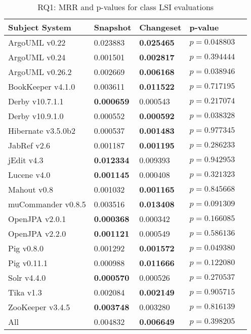 
\begin{table}[t]
\renewcommand{\arraystretch}{1.3}
\footnotesize
\centering
\caption{RQ1: MRR and p-values for class LSI evaluations}
\begin{tabular}{l|ll|ll}
   \toprule
    Subject System & Snapshot & Changeset & p-value  \\
    \midrule

ArgoUML v0.22 & 0.023883 & {\bf 0.025465 } & $p = 0.048803$ \\
ArgoUML v0.24 & 0.001501 & {\bf 0.002817 } & $p = 0.394444$ \\
ArgoUML v0.26.2 & 0.002669 & {\bf 0.006168 } & $p = 0.038946$ \\
BookKeeper v4.1.0 & 0.003611 & {\bf 0.011522 } & $p = 0.717195$ \\
Derby v10.7.1.1 & {\bf 0.000659 } & 0.000543 & $p = 0.217074$ \\
Derby v10.9.1.0 & 0.000552 & {\bf 0.000592 } & $p = 0.038328$ \\
Hibernate v3.5.0b2 & 0.000537 & {\bf 0.001483 } & $p = 0.977345$ \\
JabRef v2.6 & 0.001187 & {\bf 0.001195 } & $p = 0.286233$ \\
jEdit v4.3 & {\bf 0.012334 } & 0.009393 & $p = 0.942953$ \\
Lucene v4.0 & {\bf 0.001145 } & 0.000408 & $p = 0.321323$ \\
Mahout v0.8 & 0.001032 & {\bf 0.001165 } & $p = 0.845668$ \\
muCommander v0.8.5 & 0.003516 & {\bf 0.013408 } & $p = 0.091309$ \\
OpenJPA v2.0.1 & {\bf 0.000368 } & 0.000342 & $p = 0.166085$ \\
OpenJPA v2.2.0 & {\bf 0.001121 } & 0.000549 & $p = 0.586136$ \\
Pig v0.8.0 & 0.001292 & {\bf 0.001572 } & $p = 0.049380$ \\
Pig v0.11.1 & 0.000988 & {\bf 0.011666 } & $p = 0.122080$ \\
Solr v4.4.0 & {\bf 0.000570 } & 0.000526 & $p = 0.270537$ \\
Tika v1.3 & 0.002084 & {\bf 0.002149 } & $p = 0.905715$ \\
ZooKeeper v3.4.5 & {\bf 0.003748 } & 0.003280 & $p = 0.816139$ \\
\midrule
All & 0.004832 & {\bf 0.006649 } & $p = 0.398205$ \\

    \bottomrule
\end{tabular}
\label{table:rq1:class:lsi}
\end{table}

